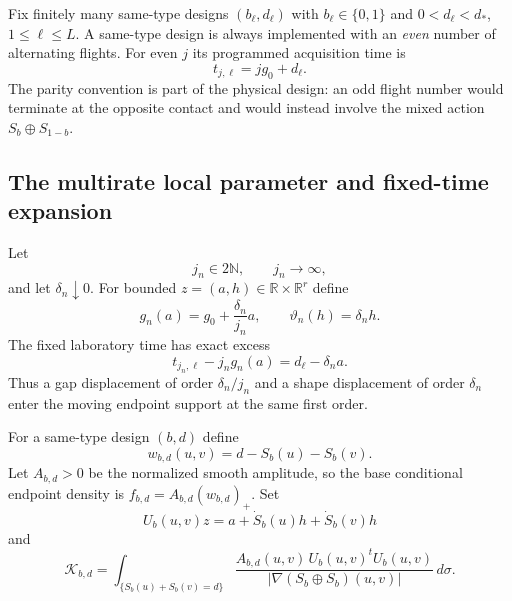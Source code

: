 Fix finitely many same-type designs $(b_\ell,d_\ell)$ with
$b_\ell\in\{0,1\}$ and $0<d_\ell<d_*$, $1\le\ell\le L$.  A same-type design
is always implemented with an \emph{even} number of alternating flights.
For even $j$ its programmed acquisition time is
\begin{equation}\label{eq:v22-fixed-physical-window}
                         t_{j,\ell}=jg_0+d_\ell.
\end{equation}
The parity convention is part of the physical design: an odd flight number
would terminate at the opposite contact and would instead involve the mixed
action $S_b\oplus S_{1-b}$.

\subsection{The multirate local parameter and fixed-time expansion}

Let
\begin{equation}\label{eq:v22-even-flight-sequence}
                 j_n\in2\mathbb N,\qquad j_n\longrightarrow\infty,
\end{equation}
and let $\delta_n\downarrow0$.  For bounded
$z=(a,h)\in\mathbb R\times\mathbb R^r$ define
\begin{equation}\label{eq:v22-multirate-parameter}
 g_n(a)=g_0+\frac{\delta_n}{j_n}a,
 \qquad
 \vartheta_n(h)=\delta_nh.
\end{equation}
The fixed laboratory time has exact excess
\begin{equation}\label{eq:v22-raw-excess}
       t_{j_n,\ell}-j_ng_n(a)=d_\ell-\delta_na.
\end{equation}
Thus a gap displacement of order $\delta_n/j_n$ and a shape displacement of
order $\delta_n$ enter the moving endpoint support at the same first order.

For a same-type design $(b,d)$ define
\begin{equation}\label{eq:v22-base-defining-function}
                    w_{b,d}(u,v)=d-S_b(u)-S_b(v).
\end{equation}
Let $A_{b,d}>0$ be the normalized smooth amplitude, so the base conditional
endpoint density is
$f_{b,d}=A_{b,d}(w_{b,d})_+$.  Set
\begin{equation}\label{eq:v22-support-velocity}
 U_b(u,v)z=a+\dot S_b(u)h+\dot S_b(v)h
\end{equation}
and
\begin{equation}\label{eq:v22-information-matrix}
 \mathcal K_{b,d}
 =\int_{\{S_b(u)+S_b(v)=d\}}
 \frac{A_{b,d}(u,v)\,U_b(u,v)^tU_b(u,v)}
 {|\nabla(S_b\oplus S_b)(u,v)|}\,d\sigma.
\end{equation}

